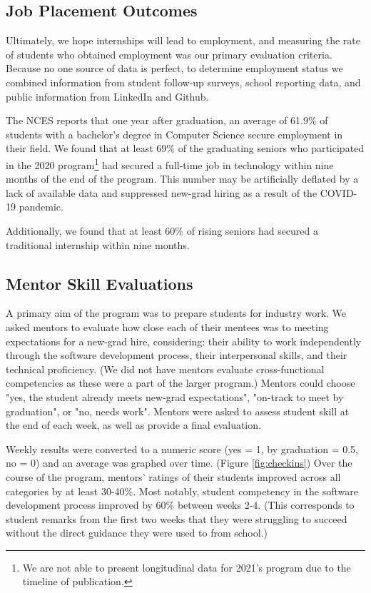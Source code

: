\subsection{Job Placement Outcomes}

Ultimately, we hope internships will lead to employment, and measuring the rate of students who obtained employment was our primary evaluation criteria. Because no one source of data is perfect, to determine employment status we combined information from student follow-up surveys, school reporting data, and public information from LinkedIn and Github.

The NCES reports that one year after graduation, an average of 61.9\% of students with a bachelor's degree in Computer Science secure employment in their field. \cite{DigestEducationStatistics2021} We found that at least 69\% of the graduating seniors who participated in the 2020 program\footnote{We are not able to present longitudinal data for 2021's program due to the timeline of publication.} had secured a full-time job in technology within nine months of the end of the program. This number may be artificially deflated by a lack of available data and suppressed new-grad hiring as a result of the COVID-19 pandemic.

Additionally, we found that at least 60\% of rising seniors had secured a traditional internship within nine months.



\subsection{Mentor Skill Evaluations}

A primary aim of the program was to prepare students for industry work. We asked mentors to evaluate how close each of their mentees was to meeting expectations for a new-grad hire, considering: their ability to work independently through the software development process, their interpersonal skills, and their technical proficiency. (We did not have mentors evaluate cross-functional competencies as these were a part of the larger program.) Mentors could choose "yes, the student already meets new-grad expectations", "on-track to meet by graduation", or "no, needs work". Mentors were asked to assess student skill at the end of each week, as well as provide a final evaluation.

Weekly results were converted to a numeric score (yes = 1, by graduation = 0.5, no = 0) and an average was graphed over time. (Figure \ref{fig:checkins}) Over the course of the program, mentors' ratings of their students improved across all categories by at least 30-40\%. Most notably, student competency in the software development process improved by 60\% between weeks 2-4. (This corresponds to student remarks from the first two weeks that they were struggling to succeed without the direct guidance they were used to from school.)

